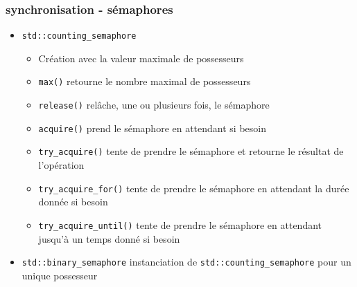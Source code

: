 \documentclass[C++.tex]{subfiles}
\begin{document}
\begin{frame}[fragile]
	\frametitle{synchronisation - sémaphores}
	\begin{itemize}
		\item \lstinline|std::counting_semaphore|
		\begin{itemize}
			\item Création avec la valeur maximale de possesseurs
			\item \lstinline|max()| retourne le nombre maximal de possesseurs
			\item \lstinline|release()| relâche, une ou plusieurs fois, le sémaphore


			\item \lstinline|acquire()| prend le sémaphore en attendant si besoin


			\item \lstinline|try_acquire()| tente de prendre le sémaphore et retourne le résultat de l'opération


			\item \lstinline|try_acquire_for()| tente de prendre le sémaphore en attendant la durée donnée si besoin
			\item \lstinline|try_acquire_until()| tente de prendre le sémaphore en attendant jusqu'à un temps donné si besoin
		\end{itemize}
		\item \lstinline|std::binary_semaphore|	instanciation de \lstinline|std::counting_semaphore| pour un unique possesseur
	\end{itemize}


\end{frame}
\end{document}

